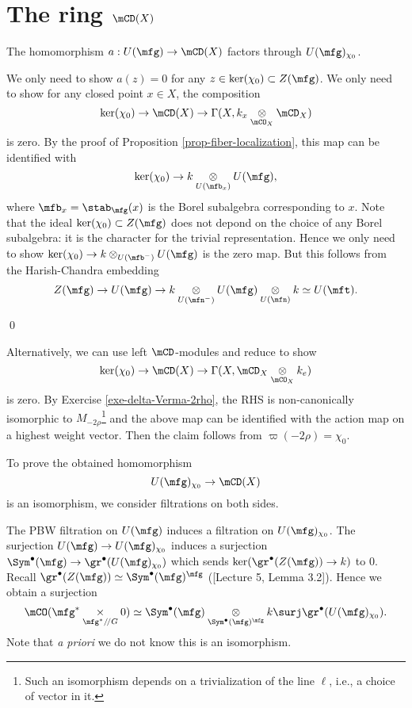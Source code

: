 \section{The ring \texorpdfstring{$\mCD(X)$}{D(Fl)}}
	

	\begin{prop}
		The homomorphism $a:U(\mfg) \to \mCD(X)$ factors through $U(\mfg)_{\chi_0}$.
	\end{prop}

	\proof
		We only need to show $a(z)=0$ for any $z\in \ker(\chi_0)\subset Z(\mfg)$. We only need to show for any closed point $x\in X$, the composition
		\[
			\ker(\chi_0) \to \mCD(X) \to \Gamma(X, k_x\ot_{\mCO_X} \mCD_X)
		\]
		is zero. By the proof of Proposition \ref{prop-fiber-localization}, this map can be identified with
		\[
			\ker(\chi_0) \to k\ot_{U(\mfb_x)} U(\mfg),
		\]
		where $\mfb_x = \stab_\mfg(x)$ is the Borel subalgebra corresponding to $x$. Note that the ideal $\ker(\chi_0)\subset Z(\mfg)$ does not depond on the choice of any Borel subalgebra: it is the character for the trivial representation. Hence we only need to show $\ker(\chi_0) \to k\ot_{U(\mfb^-)} U(\mfg)$ is the zero map. But this follows from the Harish-Chandra embedding
		\[
			Z(\mfg) \to U(\mfg) \to k\ot_{U(\mfn^-)} U(\mfg) \ot_{U(\mfn)} k\simeq U(\mft).
		\]

	\qed

	\begin{rem}
		Alternatively, we can use left $\mCD$-modules and reduce to show 
		\[
			\ker(\chi_0) \to \mCD(X) \to \Gamma(X,  \mCD_X \ot_{\mCO_X} k_e)
		\]
		is zero. By Exercise \ref{exe-delta-Verma-2rho}, the RHS is non-canonically isomorphic to $M_{-2\rho}$\footnote{Such an isomorphism depends on a trivialization of the line $\ell$, i.e., a choice of vector in it.} and the above map can be identified with the action map on a highest weight vector. Then the claim follows from $\varpi(-2\rho) = \chi_0$.
	\end{rem}

	To prove the obtained homomorphism
	\[
		U(\mfg)_{\chi_0} \to \mCD(X)
	\]
	is an isomorphism, we consider filtrations on both sides.

	\begin{constr}
		The PBW filtration on $U(\mfg)$ induces a filtration on $U(\mfg)_{\chi_0}$. The surjection $U(\mfg) \to U(\mfg)_{\chi_0}$ induces a surjection $\Sym^\bullet(\mfg) \to \gr^\bullet (U(\mfg)_{\chi_0})$ which sends $\ker(\gr^\bullet(Z(\mfg))\to k)$ to $0$. Recall $\gr^\bullet (Z(\mfg)) \simeq \Sym^\bullet(\mfg)^\mfg$ ([Lecture 5, Lemma 3.2]). Hence we obtain a surjection
		\[
			\mCO( \mfg^*\mt_{\mfg^*/\!/G} 0 ) \simeq \Sym^\bullet(\mfg) \ot_{  \Sym^\bullet(\mfg)^\mfg } k \surj \gr^\bullet (U(\mfg)_{\chi_0}).
		\] 
		Note that \emph{a priori} we do not know this is an isomorphism.

	\end{constr}
	
